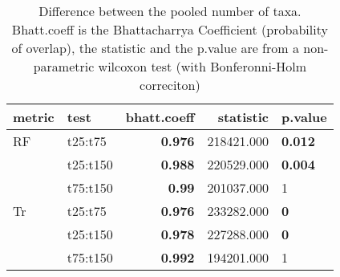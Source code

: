 \begin{table}[ht]
\centering
\begin{tabular}{llr|rl}
  \hline
metric & test & bhatt.coeff & statistic & p.value \\ 
  \hline
RF & t25:t75 & \textbf{0.976} & 218421.000 & \textbf{0.012} \\ 
   & t25:t150 & \textbf{0.988} & 220529.000 & \textbf{0.004} \\ 
   & t75:t150 & \textbf{0.99} & 201037.000 & 1 \\ 
  Tr & t25:t75 & \textbf{0.976} & 233282.000 & \textbf{0} \\ 
   & t25:t150 & \textbf{0.978} & 227288.000 & \textbf{0} \\ 
   & t75:t150 & \textbf{0.992} & 194201.000 & 1 \\ 
   \hline
\end{tabular}
\caption{Difference between the pooled number of taxa. Bhatt.coeff is the Bhattacharrya Coefficient (probability of overlap), the statistic and the p.value are from a non-parametric wilcoxon test (with Bonferonni-Holm correciton)} 
\label{Tab_pooledstaxa_test}
\end{table}
